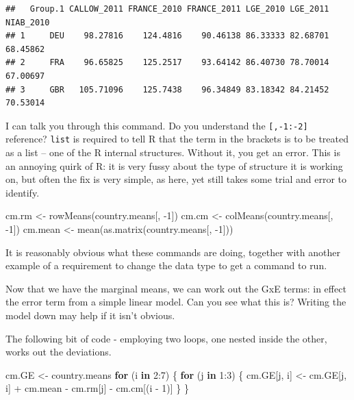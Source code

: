 \documentclass[
]{book}
\newenvironment{Shaded}{\begin{snugshade}}{\end{snugshade}}
\newcommand{\ControlFlowTok}[1]{\textcolor[rgb]{0.13,0.29,0.53}{\textbf{#1}}}
\newcommand{\DecValTok}[1]{\textcolor[rgb]{0.00,0.00,0.81}{#1}}
\newcommand{\FunctionTok}[1]{\textcolor[rgb]{0.00,0.00,0.00}{#1}}
\newcommand{\NormalTok}[1]{#1}
\newcommand{\OtherTok}[1]{\textcolor[rgb]{0.56,0.35,0.01}{#1}}
\newcommand{\SpecialCharTok}[1]{\textcolor[rgb]{0.00,0.00,0.00}{#1}}
\begin{document}
\begin{verbatim}
##   Group.1 CALLOW_2011 FRANCE_2010 FRANCE_2011 LGE_2010 LGE_2011 NIAB_2010
## 1     DEU    98.27816    124.4816    90.46138 86.33333 82.68701  68.45862
## 2     FRA    96.65825    125.2517    93.64142 86.40730 78.70014  67.00697
## 3     GBR   105.71096    125.7438    96.34849 83.18342 84.21452  70.53014
\end{verbatim}

I can talk you through this command. Do you understand the \texttt{{[},-1:-2{]}} reference? \texttt{list} is required to tell R that the term in the brackets is to be treated as a list -- one of the R internal structures. Without it, you get an error. This is an annoying quirk of R: it is very fussy about the type of structure it is working on, but often the fix is very simple, as here, yet still takes some trial and error to identify.

\begin{Shaded}
\begin{Highlighting}[]
\NormalTok{cm.rm }\OtherTok{\textless{}{-}} \FunctionTok{rowMeans}\NormalTok{(country.means[, }\SpecialCharTok{{-}}\DecValTok{1}\NormalTok{])}
\NormalTok{cm.cm }\OtherTok{\textless{}{-}} \FunctionTok{colMeans}\NormalTok{(country.means[, }\SpecialCharTok{{-}}\DecValTok{1}\NormalTok{])}
\NormalTok{cm.mean }\OtherTok{\textless{}{-}} \FunctionTok{mean}\NormalTok{(}\FunctionTok{as.matrix}\NormalTok{(country.means[, }\SpecialCharTok{{-}}\DecValTok{1}\NormalTok{]))}
\end{Highlighting}
\end{Shaded}

It is reasonably obvious what these commands are doing, together with another example of a requirement to change the data type to get a command to run.

Now that we have the marginal means, we can work out the GxE terms: in effect the error term from a simple linear model. Can you see what this is? Writing the model down may help if it isn't obvious.

The following bit of code - employing two loops, one nested inside the other, works out the deviations.

\begin{Shaded}
\begin{Highlighting}[]
\NormalTok{cm.GE }\OtherTok{\textless{}{-}}\NormalTok{ country.means}
\ControlFlowTok{for}\NormalTok{ (i }\ControlFlowTok{in} \DecValTok{2}\SpecialCharTok{:}\DecValTok{7}\NormalTok{) \{}
    \ControlFlowTok{for}\NormalTok{ (j }\ControlFlowTok{in} \DecValTok{1}\SpecialCharTok{:}\DecValTok{3}\NormalTok{) \{}
\NormalTok{        cm.GE[j, i] }\OtherTok{\textless{}{-}}\NormalTok{ cm.GE[j, i] }\SpecialCharTok{+}\NormalTok{ cm.mean }\SpecialCharTok{{-}}\NormalTok{ cm.rm[j] }\SpecialCharTok{{-}}\NormalTok{ cm.cm[(i }\SpecialCharTok{{-}} 
            \DecValTok{1}\NormalTok{)]}
\NormalTok{    \}}
\NormalTok{\}}
\end{Highlighting}
\end{Shaded}
\end{document}

